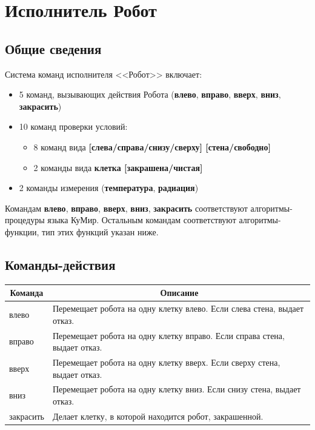 \section{Исполнитель Робот}

\subsection{Общие сведения}

Система команд исполнителя <<Робот>> включает:
\begin{itemize}
\item 5 команд, вызывающих действия Робота (\textbf{влево}, \textbf{вправо}, \textbf{вверх}, \textbf{вниз}, \textbf{закрасить})
\item 10 команд проверки условий:
	\begin{itemize}
	\item 8 команд вида \textbf{[слева/справа/снизу/сверху] [стена/свободно]}
	\item 2 команды вида \textbf{клетка [закрашена/чистая]}
	\end{itemize}
\item 2 команды измерения (\textbf{температура}, \textbf{радиация})
\end{itemize}

Командам  \textbf{влево}, \textbf{вправо}, \textbf{вверх}, \textbf{вниз}, \textbf{закрасить} соответствуют ал\-го\-рит\-мы-про\-це\-ду\-ры языка КуМир. Остальным командам соответствуют алгоритмы-функции, тип этих функций указан ниже.

\subsection{Команды-действия}

\begin{center}
\begin{tabular}{||p{2.5cm}|p{12cm}||}
\hline
\hline
\multicolumn{1}{||c|}{\bfseries Команда} & \multicolumn{1}{|c||}{\bfseries Описание}\\
\hline
	влево &
	Перемещает робота на одну клетку влево. Если слева стена, выдает отказ.\\
	вправо &
	Перемещает робота на одну клетку вправо. Если справа стена, выдает отказ.\\
 	вверх &
	Перемещает робота на одну клетку вверх. Если сверху стена, выдает отказ.\\
	вниз &
	Перемещает робота на одну клетку вниз. Если снизу стена, выдает отказ.\\
	закрасить &
	Делает клетку, в которой находится робот, закрашенной.\\
\hline
\hline
\end{tabular}
\end{center}

